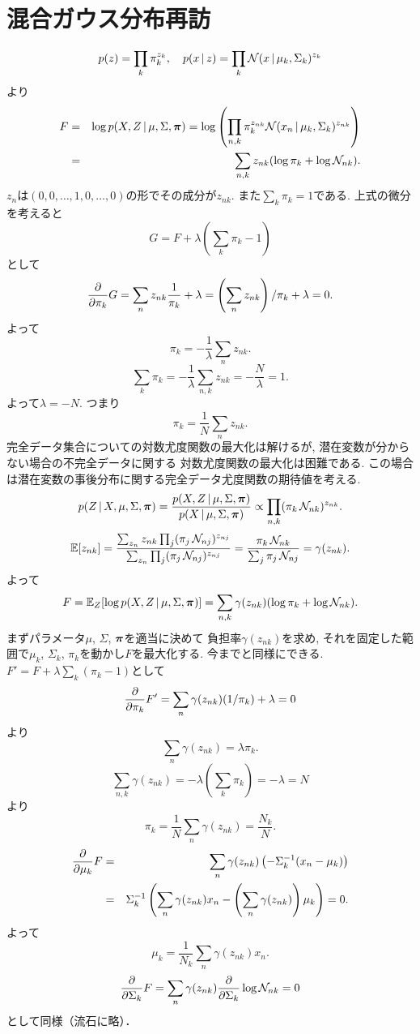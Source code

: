 \section{混合ガウス分布再訪}
$$
p(z)=\prod_k \pi_k^{z_{k}}, \quad p(x\,|\,z)=\prod_k {\cal N}(x\,|\,\mu_k,\Sigma_k)^{z_k}
$$
より
\begin{eqnarray*}
F
 &=& \log p(X,Z\,|\,\mu,\Sigma,\bm{\pi})
 = \log \left(\prod_{n,k} \pi_k^{z_{nk}}{\cal N}(x_n\,|\,\mu_k,\Sigma_k)^{z_{nk}}\right)\\
 &=& \sum_{n,k} z_{nk}(\log \pi_k + \log {\cal N}_{nk}).
\end{eqnarray*}
$z_n$は$(0, 0,\ldots, 1, 0, \ldots, 0)$の形でその成分が$z_{nk}$.
また$\sum_k \pi_k=1$である.
上式の微分を考えると
$$
G=F+\lambda\left(\sum_k \pi_k-1\right)
$$
として
$$
\frac{\partial}{\partial \pi_k}G=\sum_n z_{nk}\frac{1}{\pi_k}+\lambda=\left(\sum_n z_{nk}\right)/\pi_k + \lambda=0.
$$
よって
$$
\pi_k = -\frac{1}{\lambda}\sum_n z_{nk}.
$$
$$
\sum_k \pi_k=-\frac{1}{\lambda}\sum_{n,k}z_{nk}=-\frac{N}{\lambda}=1.
$$
よって$\lambda=-N$.
つまり
$$
\pi_k=\frac{1}{N}\sum_n z_{nk}.
$$
完全データ集合についての対数尤度関数の最大化は解けるが, 
潜在変数が分からない場合の不完全データに関する
対数尤度関数の最大化は困難である.
この場合は潜在変数の事後分布に関する完全データ尤度関数の期待値を考える.
$$
p(Z\,|\,X,\mu,\Sigma,\bm{\pi})
 = \frac{p(X,Z\,|\,\mu,\Sigma,\bm{\pi})}{p(X\,|\,\mu,\Sigma,\bm{\pi})}
 \propto \prod_{n,k} (\pi_k\,{\cal N}_{nk})^{z_{nk}}.
$$
$$
\mathbb{E}[z_{nk}]=\frac{\sum_{z_n} z_{nk} \prod_j (\pi_j\,{\cal N}_{nj})^{z_{nj}}}
               {\sum_{z_n} \prod_j(\pi_j\,{\cal N}_{nj})^{z_{nj}}}
         =\frac{\pi_k\,{\cal N}_{nk}}{\sum_j \pi_j\,{\cal N}_{nj}} = \gamma(z_{nk}).
$$
よって
$$
F=\mathbb{E}_Z[\log p(X,Z\,|\,\mu,\Sigma,\bm{\pi})]=\sum_{n,k}\gamma(z_{nk})(\log \pi_k + \log {\cal N}_{nk}).
$$
まずパラメータ$\mu$, $\Sigma$, $\bm{\pi}$を適当に決めて
負担率$\gamma(z_{nk})$を求め,
それを固定した範囲で$\mu_k$, $\Sigma_k$, $\pi_k$を動かし$F$を最大化する.
今までと同様にできる.
$F'=F+\lambda\sum_k\left(\pi_k-1\right)$として
$$
\frac{\partial}{\partial \pi_k}F'=\sum_n \gamma(z_{nk})(1/\pi_k)+\lambda=0
$$
より
$$
\sum_n \gamma(z_{nk})=\lambda \pi_k.
$$
$$
\sum_{n,k}\gamma(z_{nk})=-\lambda\left(\sum_k \pi_k\right)=-\lambda=N
$$
より
$$
\pi_k=\frac{1}{N}\sum_n \gamma(z_{nk})=\frac{N_k}{N}.
$$
\begin{eqnarray*}
\frac{\partial}{\partial \mu_k}F
&=&\sum_n\gamma(z_{nk})\left(-\Sigma_k^{-1}(x_n-\mu_k)\right)
\\
&=&\Sigma_k^{-1}\left(\sum_n \gamma(z_{nk})x_n-\left(\sum_n \gamma(z_{nk})\right)\mu_k\right)=0.
\end{eqnarray*}
よって
$$
\mu_k=\frac{1}{N_k}\sum_n \gamma(z_{nk})x_n.
$$
$$
\frac{\partial}{\partial \Sigma_k}F=\sum_n \gamma(z_{nk}) \frac{\partial}{\partial \Sigma_k}\log {\cal N}_{nk}=0
$$
として同様（流石に略）．


